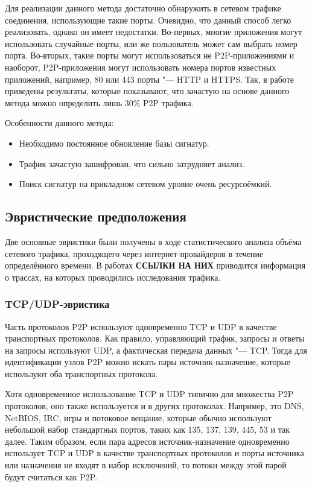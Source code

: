 \documentclass[bachelor, och, coursework]{SCWorks}
\begin{document}
Для реализации данного метода достаточно обнаружить в сетевом трафике соединения, использующие такие порты.
Очевидно, что данный способ легко реализовать, однако он имеет недостатки. Во-первых, многие приложения могут
использовать случайные порты, или же пользователь может сам выбрать номер порта. Во-вторых, такие порты могут использоваться не P2P-приложениями и наоборот, P2P-приложения могут использовать номера портов известных приложений, например, 80 или 443 порты "--- HTTP и HTTPS. Так, в работе \cite{30percent}
приведены результаты, которые показывают, что зачастую на основе данного метода можно определить лишь 30\% P2P трафика.

Особенности данного метода:
\begin{itemize}
    \item Необходимо постоянное обновление базы сигнатур.
    \item Трафик зачастую зашифрован, что сильно затрудняет анализ.
    \item Поиск сигнатур на прикладном сетевом уровне очень ресурсоёмкий.
\end{itemize}

\subsection{Эвристические предположения}
Две основные эвристики были получены в ходе статистического анализа объёма сетевого трафика, проходящего через интернет-провайдеров в течение определённого времени. В работах \textbf{ССЫЛКИ НА НИХ} приводится информация о трассах, на которых проводились исследования трафика.

\subsubsection{TCP/UDP-эвристика}
Часть протоколов P2P используют одновременно TCP и UDP в качестве транспортных протоколов. Как правило, управляющий трафик, запросы и ответы на запросы используют UDP, а фактическая передача данных "--- TCP. Тогда для идентификации узлов P2P можно искать пары источник-назначение, которые используют оба транспортных протокола.

Хотя одновременное использование TCP и UDP типично для множества P2P протоколов, оно также используется и в других протоколах. Например, это DNS, NetBIOS, IRC, игры и потоковое вещание, которые обычно используют небольшой набор стандартных портов, таких как 135, 137, 139, 445, 53 и так далее. Таким образом, если пара адресов источник-назначение одновременно использует TCP и UDP в качестве транспортных протоколов и порты источника или назначения не входят в набор исключений, то потоки между этой парой будут считаться как P2P.
\end{document}
